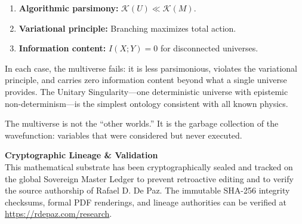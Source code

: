 \documentclass[12pt, a4paper]{article}
\theoremstyle{plain}
\theoremstyle{definition}
\theoremstyle{remark}
\newcommand{\K}{\mathcal{K}}
\begin{document}
\begin{enumerate}
  \item \textbf{Algorithmic parsimony:} $\K(U) \ll \K(M)$.
  \item \textbf{Variational principle:} Branching maximizes total action.
  \item \textbf{Information content:} $I(X; Y) = 0$ for disconnected
    universes.
\end{enumerate}

In each case, the multiverse fails: it is less parsimonious, violates the
variational principle, and carries zero information content beyond what a
single universe provides. The Unitary Singularity---one deterministic
universe with epistemic non-determinism---is the simplest ontology
consistent with all known physics.

The multiverse is not the ``other worlds.'' It is the garbage collection
of the wavefunction: variables that were considered but never executed.


\vspace{2em}
\noindent\hrulefill
\vspace{1em}

\noindent\textbf{Cryptographic Lineage \& Validation}\\
This mathematical substrate has been cryptographically sealed and tracked on the global Sovereign Master Ledger to prevent retroactive editing and to verify the source authorship of Rafael D. De Paz. The immutable SHA-256 integrity checksums, formal PDF renderings, and lineage authorities can be verified at \url{https://rdepaz.com/research}.



\end{document}
